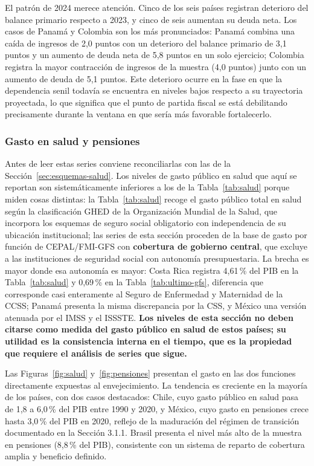 \documentclass[12pt, letterpaper]{article}
\begin{document}
El patrón de 2024 merece atención. Cinco de los seis países registran deterioro del
balance primario respecto a 2023, y cinco de seis aumentan su deuda neta. Los casos de
Panamá y Colombia son los más pronunciados: Panamá combina una caída de ingresos de 2,0 puntos con un deterioro del balance primario de 3,1 puntos y un aumento de deuda neta de 5,8 puntos en un solo ejercicio; Colombia registra la mayor contracción de
ingresos de la muestra (4,0 puntos) junto con un aumento de deuda de 5,1 puntos. Este deterioro ocurre en la fase en que la dependencia senil todavía se encuentra en niveles bajos respecto a su trayectoria proyectada, lo que significa que el punto de partida
fiscal se está debilitando precisamente durante la ventana en que sería más favorable fortalecerlo.

\subsubsection{Gasto en salud y pensiones}
\label{sec:gfs-funcional}

Antes de leer estas series conviene reconciliarlas con las de la
Sección~\ref{sec:esquemas-salud}. Los niveles de gasto público en salud que aquí se
reportan son sistemáticamente inferiores a los de la Tabla~\ref{tab:salud} porque
miden cosas distintas: la Tabla~\ref{tab:salud} recoge el gasto público total en
salud según la clasificación GHED de la Organización Mundial de la Salud, que
incorpora los esquemas de seguro social obligatorio con independencia de su
ubicación institucional; las series de esta sección proceden de la base de gasto
por función de CEPAL/FMI-GFS con \textbf{cobertura de gobierno central}, que
excluye a las instituciones de seguridad social con autonomía presupuestaria. La
brecha es mayor donde esa autonomía es mayor: Costa Rica registra 4,61\,\% del PIB
en la Tabla~\ref{tab:salud} y 0,69\,\% en la Tabla~\ref{tab:ultimo-gfs}, diferencia
que corresponde casi enteramente al Seguro de Enfermedad y Maternidad de la CCSS;
Panamá presenta la misma discrepancia por la CSS, y México una versión atenuada por
el IMSS y el ISSSTE. \textbf{Los niveles de esta sección no deben citarse como
medida del gasto público en salud de estos países; su utilidad es la consistencia
interna en el tiempo, que es la propiedad que requiere el análisis de series que
sigue.}

Las Figuras~\ref{fig:salud} y~\ref{fig:pensiones} presentan el gasto en las dos
funciones directamente expuestas al envejecimiento. La tendencia es creciente en la
mayoría de los países, con dos casos destacados: Chile, cuyo gasto público en salud
pasa de 1,8 a 6,0\,\% del PIB entre 1990 y 2020, y México, cuyo gasto en pensiones
crece hasta 3,0\,\% del PIB en 2020,
reflejo de la maduración del régimen de transición documentado en la Sección 3.1.1. Brasil presenta el nivel más alto de la muestra en pensiones (8,8\,\% del
PIB), consistente con un sistema de reparto de cobertura amplia y beneficio definido.
\end{document}
